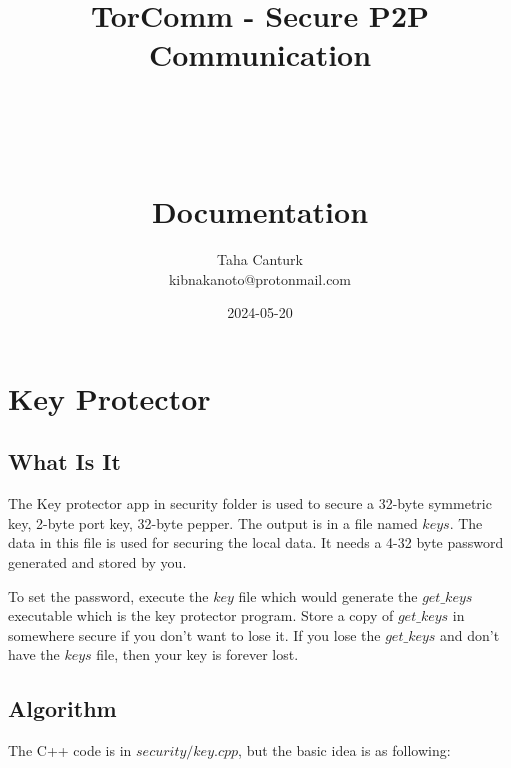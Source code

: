 \documentclass[a4paper,12pt]{article}
\title{
	\Huge TorComm - Secure P2P Communication \\
	\ \\
	\ \\
	\ \\
	\Large Documentation
}
\author{Taha Canturk\\kibnakanoto@protonmail.com}
\date{2024-05-20}
\begin{document}
\maketitle

\newpage


\newpage

\tableofcontents

\newpage


\section{Key Protector}

\subsection{What Is It}

The Key protector app in security folder is used to secure a 32-byte symmetric key, 2-byte port key, 32-byte pepper. The output is in a file named $keys$. The data in this file is used for securing the local data. It needs a 4-32 byte password generated and stored by you. 

To set the password, execute the $key$ file which would generate the $get\_keys$ executable which is the key protector program. Store a copy of $get\_keys$ in somewhere secure if you don't want to lose it. If you lose the $get\_keys$ and don't have the $keys$ file, then your key is forever lost.

\subsection{Algorithm}
The C++ code is in $security/key.cpp$, but the basic idea is as following:
\end{document}
